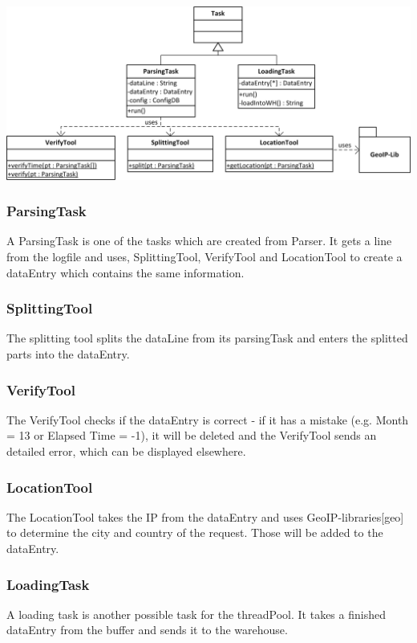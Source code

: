 \begin{center}
\includegraphics[width=1\linewidth]{Pictures/Parts/TaskTool.png}
\end{center}  

\subsubsection*{ParsingTask}
A ParsingTask is one of the tasks which are created from Parser. It gets a line from the logfile and uses, SplittingTool, VerifyTool
and LocationTool to create a dataEntry which contains the same information. 


\subsubsection*{SplittingTool}
The splitting tool splits the dataLine from its parsingTask and enters the splitted parts into the dataEntry.

\subsubsection*{VerifyTool}
The VerifyTool checks if the dataEntry is correct - if it has a mistake (e.g. Month = 13 or Elapsed Time = -1), it will 
be deleted and the VerifyTool sends an detailed error, which can be displayed elsewhere.

\subsubsection*{LocationTool}
The LocationTool takes the IP from the dataEntry and uses GeoIP-libraries[geo] to determine the city and country of the request.
Those will be added to the dataEntry.


\subsubsection*{LoadingTask}
A loading task is another possible task for the threadPool. It takes a finished dataEntry from the buffer and sends it to the warehouse.

